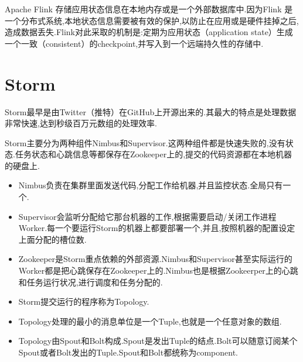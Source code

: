 \documentclass[lang=cn,11pt,a4paper,cite=authoryear]{elegantpaper}
\begin{document}
Apache Flink 存储应用状态信息在本地内存或是一个外部数据库中.因为Flink 是一个分布式系统,本地状态信息需要被有效的保护,以防止在应用或是硬件挂掉之后,造成数据丢失.Flink对此采取的机制是:定期为应用状态（application state）生成一个一致（consistent）的checkpoint,并写入到一个远端持久性的存储中.
\section{Storm}
Storm最早是由Twitter（推特）在GitHub上开源出来的.其最大的特点是处理数据非常快速,达到秒级百万元数组的处理效率.

Storm主要分为两种组件Nimbus和Supervisor.这两种组件都是快速失败的,没有状态.任务状态和心跳信息等都保存在Zookeeper上的,提交的代码资源都在本地机器的硬盘上.

\begin{itemize}
	\item Nimbus负责在集群里面发送代码,分配工作给机器,并且监控状态.全局只有一个.
	\item Supervisor会监听分配给它那台机器的工作,根据需要启动/关闭工作进程Worker.每一个要运行Storm的机器上都要部署一个,并且,按照机器的配置设定上面分配的槽位数.
	\item Zookeeper是Storm重点依赖的外部资源.Nimbus和Supervisor甚至实际运行的Worker都是把心跳保存在Zookeeper上的.Nimbus也是根据Zookeerper上的心跳和任务运行状况,进行调度和任务分配的.
	\item Storm提交运行的程序称为Topology.
	\item Topology处理的最小的消息单位是一个Tuple,也就是一个任意对象的数组.
	\item Topology由Spout和Bolt构成.Spout是发出Tuple的结点.Bolt可以随意订阅某个Spout或者Bolt发出的Tuple.Spout和Bolt都统称为component.
\end{itemize}
\end{document}
